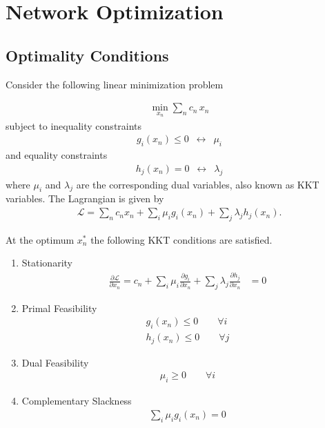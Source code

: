 \documentclass[11pt,twocolumn]{article}
\newcommand{\resultsin}[1]{\hspace{6pt} \leftrightarrow  \hspace{6pt} #1}
\newcommand{\pdv}[2]{\frac{\partial #1}{\partial #2}}
\newcommand{\lagrangian}{\mathcal{L}}
\begin{document}
\renewcommand\theequation{\thesection.\arabic{equation}}
\setcounter{equation}{0}

\renewcommand\thefigure{\thesection.\arabic{figure}}
\setcounter{figure}{0}

\section{Network Optimization}

\subsection{Optimality Conditions}
\label{sec:optimality_conditions}

Consider the following linear minimization problem

\begin{align}
    \min_{x_n} \sum_n c_n \, x_n
\end{align}
subject to inequality constraints
\begin{align}
    g_i(x_n) \le 0 \resultsin{\mu_i}
\end{align}
and equality constraints
\begin{align}
    h_j(x_n) = 0 \resultsin{\lambda_j}
\end{align}
where $\mu_i$ and $\lambda_j$ are the corresponding dual variables, also known as \ac{KKT} variables.
The Lagrangian is given by
\begin{align}
    \lagrangian = \sum_n c_n x_n + \sum_i \mu_i g_i(x_n) + \sum_j \lambda_j h_j(x_n).
\end{align}

At the optimum $x^*_n$ the following \ac{KKT} conditions are satisfied.
\begin{enumerate}
    \item Stationarity \\
          \begin{align}
              \pdv{\lagrangian}{x_n} = c_n + \sum_i \mu_i \pdv{g_i}{x_n} + \sum_j \lambda_j \pdv{h_j}{x_n} & = 0
          \end{align}
    \item Primal Feasibility \\
          \begin{align}
              g_i(x_n) \le 0 \qquad \forall i \\
              h_j(x_n) \le 0 \qquad \forall j
          \end{align}
    \item Dual Feasibility \\
          \begin{align}
              \mu_i \ge 0 \qquad \forall i
          \end{align}
    \item Complementary Slackness \\
          \begin{align}
              \sum_i \mu_i g_i(x_n) = 0
          \end{align}
\end{enumerate}
\end{document}
